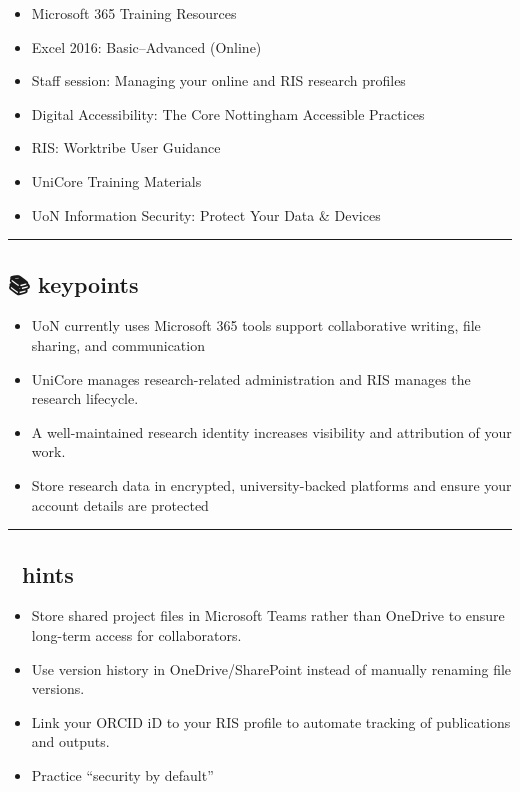 \documentclass[
  letterpaper,
  DIV=11,
  numbers=noendperiod]{scrartcl}
\providecommand{\tightlist}{%
  \setlength{\itemsep}{0pt}\setlength{\parskip}{0pt}}
\begin{document}
\begin{itemize}
\tightlist
\item
  Microsoft 365 Training Resources
\item
  Excel 2016: Basic--Advanced (Online)
\item
  Staff session: Managing your online and RIS research profiles
\item
  Digital Accessibility: The Core Nottingham Accessible Practices
\item
  RIS: Worktribe User Guidance
\item
  UniCore Training Materials
\item
  UoN Information Security: Protect Your Data \& Devices
\end{itemize}

\begin{center}\rule{0.5\linewidth}{0.5pt}\end{center}

\subsection{📚 keypoints}\label{keypoints}

\begin{itemize}
\tightlist
\item
  UoN currently uses Microsoft 365 tools support collaborative writing,
  file sharing, and communication
\item
  UniCore manages research-related administration and RIS manages the
  research lifecycle.
\item
  A well-maintained research identity increases visibility and
  attribution of your work.
\item
  Store research data in encrypted, university-backed platforms and
  ensure your account details are protected
\end{itemize}

\begin{center}\rule{0.5\linewidth}{0.5pt}\end{center}

\subsection{🔦 hints}\label{hints}

\begin{itemize}
\tightlist
\item
  Store shared project files in Microsoft Teams rather than OneDrive to
  ensure long-term access for collaborators.
\item
  Use version history in OneDrive/SharePoint instead of manually
  renaming file versions.
\item
  Link your ORCID iD to your RIS profile to automate tracking of
  publications and outputs.
\item
  Practice ``security by default''
\end{itemize}
\end{document}

